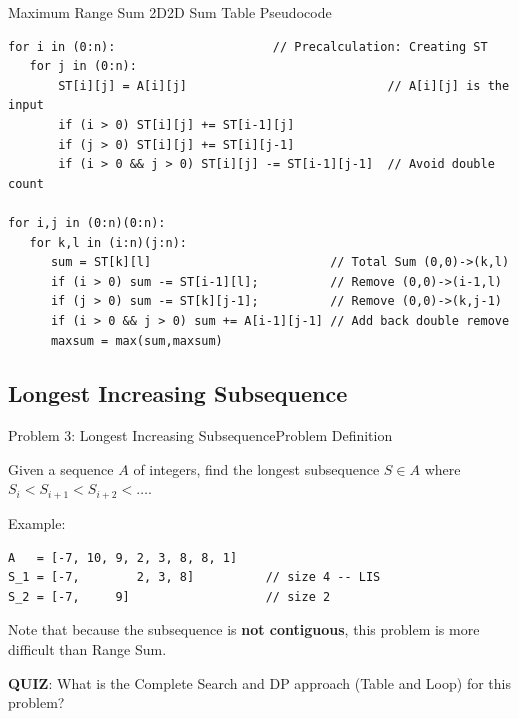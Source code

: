 \begin{frame}[fragile]{Maximum Range Sum 2D}{2D Sum Table Pseudocode}
\begin{block}{}
{\smaller
\begin{verbatim}
for i in (0:n):                      // Precalculation: Creating ST
   for j in (0:n):
       ST[i][j] = A[i][j]                            // A[i][j] is the input
       if (i > 0) ST[i][j] += ST[i-1][j]
       if (j > 0) ST[i][j] += ST[i][j-1]
       if (i > 0 && j > 0) ST[i][j] -= ST[i-1][j-1]  // Avoid double count

for i,j in (0:n)(0:n):
   for k,l in (i:n)(j:n):
      sum = ST[k][l]                         // Total Sum (0,0)->(k,l)
      if (i > 0) sum -= ST[i-1][l];          // Remove (0,0)->(i-1,l)
      if (j > 0) sum -= ST[k][j-1];          // Remove (0,0)->(k,j-1)
      if (i > 0 && j > 0) sum += A[i-1][j-1] // Add back double remove
      maxsum = max(sum,maxsum)
\end{verbatim}
}
\end{block}

\end{frame}

\subsection{Longest Increasing Subsequence}

\begin{frame}[fragile]{Problem 3: Longest Increasing Subsequence}{Problem Definition}
  \begin{block}{}
    Given a sequence $A$ of integers, find the longest subsequence $S \in A$ where $S_i < S_{i+1} < S_{i+2} < \ldots$.
  \end{block}
  \bigskip

  Example:
\begin{verbatim}
A   = [-7, 10, 9, 2, 3, 8, 8, 1]
S_1 = [-7,        2, 3, 8]          // size 4 -- LIS
S_2 = [-7,     9]                   // size 2
\end{verbatim}
\bigskip

Note that because the subsequence is {\bf not contiguous}, this problem is more difficult than Range Sum.
\bigskip

{\bf QUIZ}: What is the \alert{Complete Search} and \alert{DP approach} (Table and Loop) for this problem?
\end{frame}


